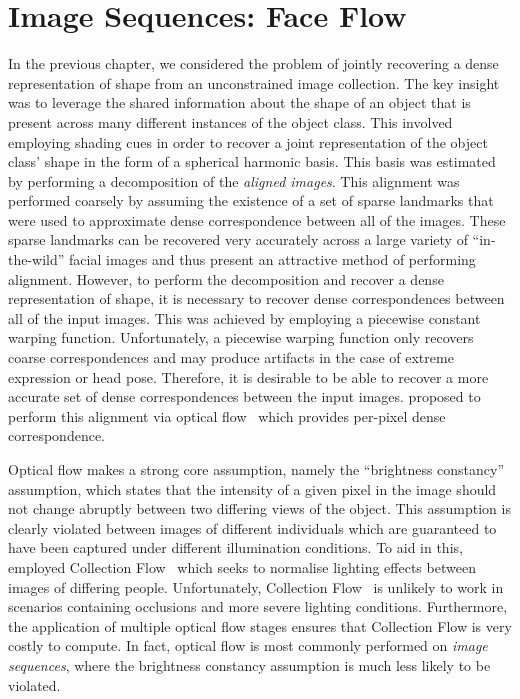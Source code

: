 \chapter{Image Sequences: Face Flow}\label{ch:face_flow}
\minitoc{}
In the previous chapter, we considered the problem of jointly recovering a
dense representation of shape from an unconstrained image collection. The key
insight was to leverage the shared information about the shape of an object
that is present across many different instances of the object class. This
involved employing shading cues in order to recover a joint representation
of the object class' shape in the form of a spherical harmonic basis. This
basis was estimated by performing a decomposition of the
\textit{aligned images}. This alignment was performed coarsely by assuming the
existence of a set of sparse landmarks that were used to approximate
dense correspondence between all of the images. These sparse landmarks can
be recovered very accurately across a large variety of ``in-the-wild'' facial
images and thus present an attractive method of performing alignment. However,
to perform the decomposition and recover a dense representation of shape, it
is necessary to recover dense correspondences between all of the input images. 
This was achieved by employing a piecewise constant warping function. Unfortunately, a
piecewise warping function only recovers coarse correspondences and may produce
artifacts in the case of extreme expression or head pose. Therefore, it is
desirable to be able to recover a more accurate set of dense correspondences 
between the input images. \citet{KemelmacherShlizerman:2013iv} proposed to
perform this alignment via optical flow~\cite{liu2009beyond} which provides
per-pixel dense correspondence. 

Optical flow makes a
strong core assumption, namely the ``brightness constancy'' assumption, which states
that the intensity of a given pixel in the image should not change abruptly
between two differing views of the object. This assumption is clearly
violated between images of different individuals which are guaranteed to
have been captured under different illumination conditions. To aid in this,
\citet{KemelmacherShlizerman:2013iv} employed
Collection Flow~\cite{kemelmacher2012collection} which seeks to normalise
lighting effects between images of differing people. Unfortunately, 
Collection Flow~\cite{kemelmacher2012collection} is unlikely to work in
scenarios containing occlusions and more severe lighting conditions.
Furthermore, the application of multiple optical flow stages ensures that Collection
Flow is very costly to compute. In fact, optical flow is most commonly performed
on \textit{image sequences}, where the brightness constancy assumption is
much less likely to be violated. 

